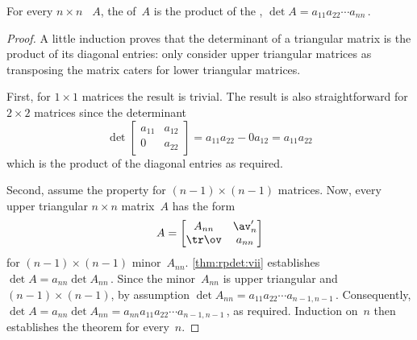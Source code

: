 \begin{theorem}\label{thm:rpdet:vi} 
For every \(n\times n\) ~\(A\),
the  of~\(A\) is the product of the , \(\det A=a_{11}a_{22}\cdots a_{nn}\)\,.
\end{theorem}
\begin{proof} 
A little induction proves that the determinant of a triangular matrix is the product of its diagonal entries: only consider upper triangular matrices as transposing the matrix caters for lower triangular matrices.

First, for \(1\times 1\) matrices the result is trivial.
The result is also straightforward for \(2\times 2\) matrices since the determinant
\begin{equation*}
\det\begin{bmatrix} a_{11}&a_{12}\\0&a_{22} \end{bmatrix}
=a_{11}a_{22}-0a_{12}=a_{11}a_{22}
\end{equation*}
which is the product of the diagonal entries as required.

Second, assume the property for \((n-1)\times(n-1)\) matrices.
Now, every upper triangular \(n\times n\) matrix~\(A\) has the form
\begin{equation*}
A=\begin{bmatrix} A_{nn}&\av_n'\\\tr\ov&a_{nn} \end{bmatrix}
\end{equation*}
for \((n-1)\times(n-1)\) minor~\(A_{nn}\).
\cref{thm:rpdet:vii} establishes \(\det A=a_{nn}\det A_{nn}\)\,.  
Since the  minor~\(A_{nn}\) is upper triangular and \((n-1)\times(n-1)\), by assumption \(\det A_{nn}=a_{11}a_{22}\cdots a_{n-1,n-1}\)\,.
Consequently, \(\det A=a_{nn}\det A_{nn}=a_{nn}a_{11}a_{22}\cdots a_{n-1,n-1}\)\,, as required.
Induction on~\(n\) then establishes the theorem for every~\(n\).
\end{proof}




